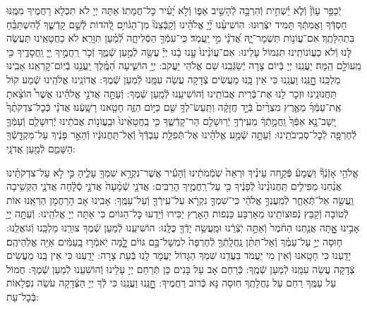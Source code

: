 \documentclass[twoside, openany, parskip=half, 11pt]{book}
\begin{document}
יְֿכַפֵּ֥ר עָוֹן֘ וְֿלֹ֢א יַ֫שְׁחִ֥ית וְֿהִרְבָּ֣ה לְֿהָשִׁ֣יב אַפּ֑וֹ וְֿלֹ֣א יָ֝עִ֗יר כׇּל־חֲמָתֽוֹ׃ אַתָּה יְיָ לֹא תִכְלָא רַחֲמֶיךָ מִמֶּֽנּוּ חַסְדְּֿךָ וַאֲמִתְּֿךָ תָּמִיד יִצְּֿרֽוּנוּ: הֽוֹשִׁיעֵ֨נוּ יְ֘יָ֤ אֱלֹהֵ֗ינוּ וְֿקַבְּֿצֵנוּ֘ מִן־הַגּ֫וֹיִ֥ם לְֿ֭הֹדוֹת לְֿשֵׁ֣ם קָדְֿשֶׁ֑ךָ לְֿ֝הִשְׁתַּבֵּ֗חַ בִּתְהִלָּתֶֽךָ׃
אִם־עֲוֹנ֥וֹת תִּשְׁמָר־יָ֑הּ אֲ֝דֹנָ֗י מִ֣י יַֽעֲמֹֽד׃ כִּֽי־עִמְּֿךָ֥ הַסְּֿלִיחָ֑ה לְֿ֝מַ֗עַן תִּוָּרֵֽא׃ לֹא כַחֲטָאֵֽינוּ תַּעֲשֶׂה לָּנוּ וְֿלֹא כַעֲוֹנוֹתֵֽינוּ תִּגְמוֹל עָלֵינוּ:
אִם־עֲוֹנֵ֨ינוּ֙ עָ֣נוּ בָ֔נוּ יְיָ֕ עֲשֵׂ֖ה לְֿמַ֣עַן שְֿׁמֶ֑ךָ זְֿכֹ֤ר רַֽחֲמֶ֣יךָ יְ֖יָ וַֽחֲסָדֶ֑יךָ כִּ֖י מֵֽעוֹלָ֣ם הֵֽמָּה׃ יַעֲנֵֽנוּ יְיָ בְּֿיוֹם צָרָה יְֿשַׂגְּֿבֵֽנוּ שֵׁם אֱלֹהֵי יַעֲקֹב:
יְיָ֥ הוֹשִׁ֑יעָה הַ֝מֶּֽ֗לֶךְ יַֽעֲנֵ֥נוּ בְֿיֽוֹם־קׇרְאֵֽנוּ׃
אָבִֽינוּ מַלְכֵּֽנוּ חׇׇׇׇָנֵּֽנוּ וַעֲנֵֽנוּ כִּי אֵין בָּֽנוּ מַעֲשִׂים צְֿדָקָה עֲשֵׂה עִמָּֽנוּ לְֿמַעַן שְֿׁמֶךָ:
אֲדוֹנֵֽינוּ אֱלֹהֵֽינוּ שְֿׁמַע קוֹל תַּחֲנוּנֵֽינוּ וּזְכָר לָנוּ אֶת־בְּֿרִית אֲבוֹתֵֽינוּ וְֿהוֹשִׁיעֵֽנוּ לְֿמַֽעַן שְֿׁמֶךָ:
וְֿעַתָּ֣ה אֲדֹנָ֣י אֱלֹהֵ֗ינוּ אֲשֶׁר֩ הוֹצֵ֨אתָ אֶֽת־עַמְּֿךָ֜ מֵאֶ֤רֶץ מִצְרַ֨יִם֙ בְּֿיָ֣ד חֲזָקָ֔ה וַתַּֽעַשׂ־לְךָ֥ שֵׁ֖ם כַּיּ֣וֹם הַזֶּ֑ה חָטָ֖אנוּ רָשָֽׁעְֿנוּ׃
אֲדֹנָ֗י כְּֿכׇל־צִדְקֹתֶ֨ךָ֙ יָֽשָׁב־נָ֤א אַפְּֿךָ֙ וַֽחֲמָ֣תְֿךָ֔ מֵעִֽירְֿךָ֥ יְֿרֽוּשָׁלַ֖ם הַר־קָדְֿשֶׁ֑ךָ כִּ֤י בַֽחֲטָאֵ֨ינוּ֙ וּבַֽעֲוֹנ֣וֹת אֲבֹתֵ֔ינוּ יְֿרֽוּשָׁלַ֧ם וְֿעַמְּֿךָ֛ לְֿחֶרְפָּ֖ה לְֿכׇל־סְבִֽיבֹתֵֽינוּ:
וְֿעַתָּ֣ה שְֿׁמַ֣ע אֱלֹהֵ֗ינוּ אֶל־תְּֿפִלַּ֤ת עַבְדְּֿךָ֙ וְֿאֶל־תַּֽחֲנוּנָ֔יו וְֿהָאֵ֣ר פָּנֶ֔יךָ עַל־מִקְדָּֽשְֿׁךָ֖ הַשָּׁמֵ֑ם לְֿמַ֖עַן אֲדֹנָֽי:

אֱלֹהַ֥י אָזְֿנְֿךָ֘ וּֽשֲׁמָע֒ פְּֿקַ֣חה עֵינֶ֗יךָ וּרְאֵה֙ שֹֽׁמְֿמֹתֵ֔ינוּ וְֿהָעִ֕יר אֲשֶׁר־נִקְרָ֥א שִׁמְךָ֖ עָלֶ֑יהָ כִּ֣י לֹ֣א עַל־צִדְקֹתֵ֗ינוּ אֲנַ֨חְנוּ מַפִּילִ֤ים תַּֽחֲנוּנֵ֨ינוּ֙ לְֿפָנֶ֔יךָ כִּ֖י עַל־רַֽחֲמֶ֥יךָ הָרַבִּֽים: אֲדֹנָ֤י שְֿׁמָ֨עָה֙ אֲדֹנָ֣י סְֿלָ֔חָה אֲדֹנָ֛י הַקְשִׁ֥יבָה וַֽעֲשֵׂ֖ה אַל־תְּֿאַחַ֑ר לְֿמַֽעֲנְךָ֣ אֱלֹהַ֔י כִּֽי־שִׁמְךָ֣ נִקְרָ֔א עַל־עִֽירְֿךָ֖ וְֿעַל־עַמֶּֽךָ: אָבִֽינוּ אָב הָרַחֲמָן הַרְאֵֽנוּ אוֹת לְֿטוֹבָה וְֿקַבֵּץ נְֿפוּצוֹתֵֽינוּ מֵאַרְבַּע כַּנְפוֹת הָאָרֶץ יַכִּירוּ וְֿיֵדְעוּ כׇּל־הַגּוֹיִם כִּי אַתָּה יְיָ אֱלֹהֵֽינוּ:
וְֿעַתָּ֥ה יְיָ֖ אָבִ֣ינוּ אׇׇׇָֽתָּה אֲנַ֤חְנוּ הַחֹ֨מֶר֙ וְֿאַתָּ֣ה יֹֽצְֿרֵ֔נוּ וּמַֽעֲשֵׂ֥ה יָדְֿךָ֖ כֻּלָּֽנוּ: הוֹשִׁיעֵֽנוּ לְֿמַעַן שְֿׁמֶךָ צוּרֵֽנוּ מַלְכֵּֽנוּ וְֿגוֹאֲלֵֽנוּ:
ח֧וּסָה יְיָ֣ עַל־עַמֶּ֗ךָ וְֿאַל־תִּתֵּ֨ן נַֽחֲלָֽתְֿךָ֤ לְֿחֶרְפָּה֙ לִמְשָׁל־בָּ֣ם גּוֹיִ֔ם לׇׇָ֚מָּה יֹֽאמְֿר֣וּ בָֽעַמִּ֔ים אַיֵּ֖ה אֱלֹֽהֵיהֶֽם׃ יָדַֽעְנוּ כִּי חָטָֽאנוּ וְֿאֵין מִי יַעֲמֹד בַּעֲדֵֽנוּ שִׁמְךָ הַגָּדוֹל יַעֲמָד לָֽנוּ בְּֿעֵת צָרָה: יָדַֽעְנוּ כִּי אֵין בָּֽנוּ מַעֲשִׂים צְֿדָקָה עֲשֵׂה עִמָּֽנוּ לְֿמַעַן שְֿׁמֶֽךָ: כְּֿרַחֵם אָב עַל בָּנִים כֵּן תְּֿרַחֵם יְיָ עָלֵינוּ וְֿהוֹשִׁעֵֽנוּ לְֿמַעַן שְֿׁמֶךָ: חֲמוֹל עַל עַמֶּֽךָ רַחֵם עַל נַחֲלָתֶֽךָ חֽוּסָה נָּא כְּֿרוֹב רַחֲמֶיךָ: חׇׇׇׇָנֵּֽנוּ וַעֲנֵֽנוּ כִּי לְֿךָ יְיָ הַצְּֿדָקָה עֹשֵׂה נִפְלָאוֹת בְּֿכׇל־עֵת:
\end{document}

